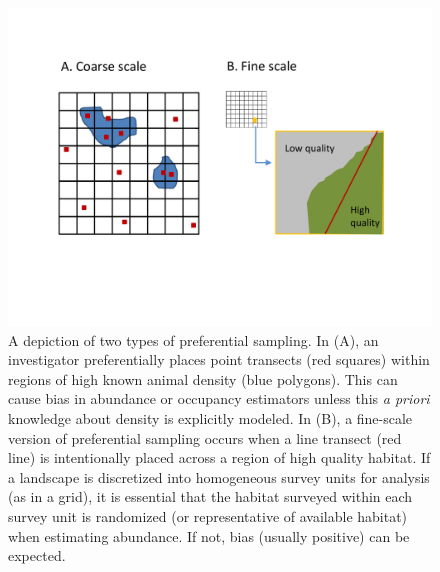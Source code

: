 \documentclass[times,mee,doublespace,]{besauth2}
\begin{document}
\begin{figure} %
\begin{center}
\includegraphics[width=170mm]{Pref_sampling_diag.pdf}
\caption{A depiction of two types of preferential sampling.  In (A), an investigator preferentially places point transects (red squares) within regions of high known animal density (blue polygons).  This can cause bias in abundance or occupancy estimators unless this \textit{a priori} knowledge about density is explicitly modeled.  In (B), a fine-scale version of preferential sampling occurs when a line transect (red line) is intentionally placed across a region of high quality habitat.  If a landscape is discretized into homogeneous survey units for analysis (as in a grid), it is essential that the habitat surveyed within each survey unit is randomized (or representative of available habitat) when estimating abundance.  If not, bias (usually positive) can be expected.}
\label{fig:pref}
\end{center}
\end{figure}
\end{document}
